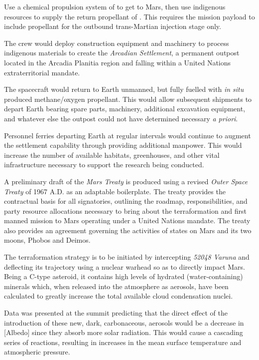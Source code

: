 \item Use a chemical propulsion system of  to get to Mars, then use indigenous resources to supply the return propellant of . This requires the mission payload to include propellant for the outbound trans-Martian injection stage only.

\item The crew would deploy construction equipment and machinery to process indigenous materials to create the {\it Arcadian Settlement}, a permanent outpost located in the Arcadia Planitia region and falling within a United Nations extraterritorial mandate.

\item The spacecraft would return to Earth unmanned, but fully fuelled with {\it in situ} produced methane/oxygen propellant. This would allow subsequent shipments to depart Earth bearing spare parts, machinery, additional excavation equipment, and whatever else the outpost could not have determined necessary {\it a priori}.

\item Personnel ferries departing Earth at regular intervals would continue to augment the settlement capability through providing additional manpower. This would increase the number of available habitats, greenhouses, and other vital infrastructure necessary to support the research being conducted.
\stopitemize

A preliminary draft of the {\it Mars Treaty} is produced using a revised {\it Outer Space Treaty} of 1967 A.D. as an adaptable boilerplate. The treaty provides the contractual basis for all signatories, outlining the roadmap, responsibilities, and party resource allocations necessary to bring about the terraformation and first manned mission to Mars operating under a United Nations mandate. The treaty also provides an agreement governing the activities of states on Mars and its two moons, Phobos and Deimos.

The terraformation strategy is to be initiated by intercepting {\it 52048 Varuna} and deflecting its trajectory using a nuclear warhead so as to directly impact Mars. Being a C-type asteroid, it contains high levels of hydrated (water-containing) minerals which, when released into the atmosphere as aerosols, have been calculated to greatly increase the total available cloud condensation nuclei.

Data was presented at the summit predicting that the direct effect of the introduction of these new, dark, carbonaceous, aerosols would be a decrease in [Albedo] since they absorb more solar radiation. This would cause a cascading series of reactions, resulting in increases in the mean surface temperature and atmospheric pressure.

